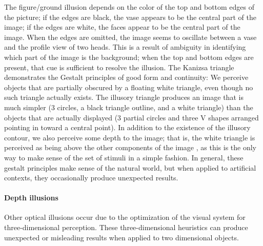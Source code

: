 \documentclass[11pt]{isuthesis}\usepackage[]{graphicx}\usepackage[]{color}
\begin{document}
The figure/ground illusion depends on the color of the top and bottom edges of the picture; if the edges are black, the vase appears to be the central part of the image; if the edges are white, the faces appear to be the central part of the image. When the edges are omitted, the image seems to oscillate between a vase and the profile view of two heads. This is a result of ambiguity in identifying which part of the image is the background; when the top and bottom edges are present, that cue is sufficient to resolve the illusion. The Kanizsa triangle demonstrates the Gestalt principles of good form and continuity: We perceive objects that are partially obscured by a floating white triangle, even though no such triangle actually exists. The illusory triangle produces an image that is much simpler (3 circles, a black triangle outline, and a white triangle) than the objects that are actually displayed (3 partial circles and three V shapes arranged pointing in toward a central point). In addition to the existence of the illusory contour, we also perceive some depth to the image; that is, the white triangle is perceived as being above the other components of the image \citep{coren1983subjective}, as this is the only way to make sense of the set of stimuli in a simple fashion. In general, these gestalt principles make sense of the natural world, but when applied to artificial contexts, they occasionally produce unexpected results. 

\paragraph{Depth illusions} Other optical illusions occur due to the optimization of the visual system for three-dimensional perception. These three-dimensional heuristics can produce unexpected or misleading results when applied to two dimensional objects. 
\end{document}
